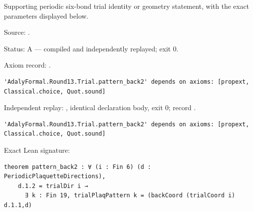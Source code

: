 \begin{theorem}[bp-387]
\label{bp-387}
\leanok
Supporting periodic six-bond trial identity or geometry statement, with the exact parameters displayed below.

\par Source: \texttt{}.
\par Status: A — compiled and independently replayed; exit 0.
\par Axiom record: \texttt{}.
\begin{verbatim}
'AdalyFormal.Round13.Trial.pattern_back2' depends on axioms: [propext, Classical.choice, Quot.sound]
\end{verbatim}
\par Independent replay: \texttt{}, identical declaration body, exit 0; record \texttt{}.
\begin{verbatim}
'AdalyFormal.Round13.Trial.pattern_back2' depends on axioms: [propext, Classical.choice, Quot.sound]
\end{verbatim}
\par Exact Lean signature:
\begin{verbatim}
theorem pattern_back2 : ∀ (i : Fin 6) (d : PeriodicPlaquetteDirections),
    d.1.2 = trialDir i →
      ∃ k : Fin 19, trialPlaqPattern k = (backCoord (trialCoord i) d.1.1,d)
\end{verbatim}
\end{theorem}

